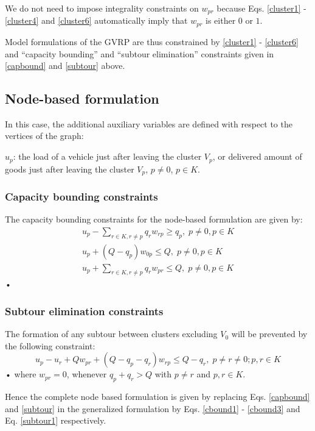 \documentclass[letterpaper,12pt,onehalfspacing,twoside]{article}
\theoremstyle{msds}
\begin{document}
We do not need to impose integrality constraints on $w_{pr}$ because Eqs. \eqref{cluster1} - \eqref{cluster4} and \eqref{cluster6} automatically imply that $w_{pr}$ is either $0$ or $1$.

Model formulations of the GVRP are thus constrained by \eqref{cluster1} - \eqref{cluster6} and ``capacity bounding'' and ``subtour elimination'' constraints given in \eqref{capbound} and \eqref{subtour} above.


\subsection{Node-based formulation}
In this case, the additional auxiliary variables are defined with respect to the vertices of the graph:

$u_{p}$: the load of a vehicle just after leaving the cluster $V_p$, or delivered amount of goods just after leaving the cluster $V_p$, $p \ne 0$, $p \in K$.

\subsubsection{Capacity bounding constraints}
The capacity bounding constraints for the node-based formulation are given by:
\begin{align}
u_p - \sum_{r \in K, r \ne p}q_r w_{rp} \ge q_p, \; p \ne 0, p \in K \label{cbound1}\\
u_p + (Q - q_p) w_{0p} \le Q, \; p \ne 0, p \in K \label{cbound2}\\
u_p + \sum_{r \in K, r \ne p} q_r w_{pr} \le Q, \; p \ne 0, p \in K \label{cbound3}
\end{align}•

\subsubsection{Subtour elimination constraints}
The formation of any subtour between clusters excluding $V_0$ will be prevented by the following constraint:
\begin{equation}
u_p - u_r + Q w_{pr} + (Q - q_p - q_r) w_{rp} \le Q - q_r, \;  p \ne r \ne 0; p, r \in K
\label{subtour1}
\end{equation}•
where $w_{pr} = 0$, whenever $q_p + q_r > Q$ with $p \ne r$ and $p, r \in K$. 

Hence the complete node based formulation is given by replacing Eqs. \eqref{capbound} and \eqref{subtour} in the generalized formulation by  Eqs. \eqref{cbound1} - \eqref{cbound3} and Eq. \eqref{subtour1} respectively.
\end{document}
